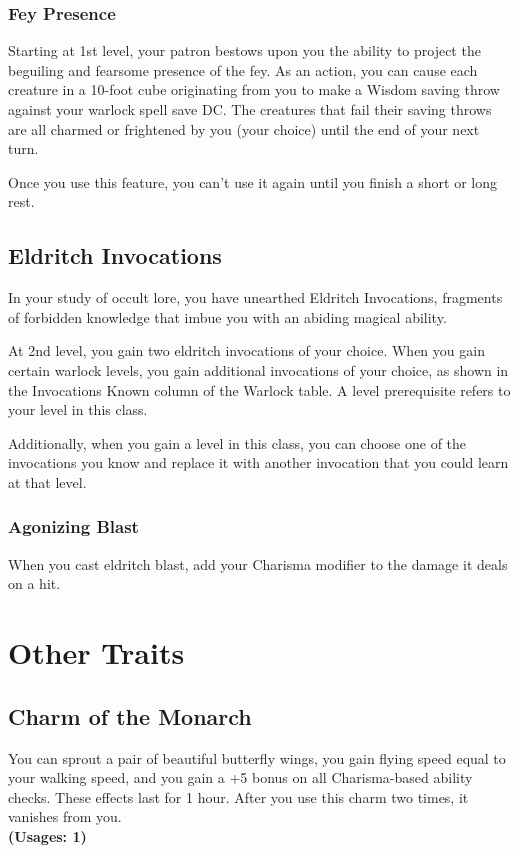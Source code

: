 \documentclass[letterpaper,openany,oneside,twocolumn]{book}
\begin{document}
\subsubsection*{Fey Presence}
Starting at 1st level, your patron bestows upon you the ability to project the beguiling and fearsome presence of the fey. As an action, you can cause each creature in a 10-foot cube originating from you to make a Wisdom saving throw against your warlock spell save DC. The creatures that fail their saving throws are all charmed or frightened by you (your choice) until the end of your next turn.

Once you use this feature, you can't use it again until you finish a short or long rest.

\subsection*{Eldritch Invocations}
In your study of occult lore, you have unearthed Eldritch Invocations, fragments of forbidden knowledge that imbue you with an abiding magical ability.

At 2nd level, you gain two eldritch invocations of your choice. When you gain certain warlock levels, you gain additional invocations of your choice, as shown in the Invocations Known column of the Warlock table. A level prerequisite refers to your level in this class.

Additionally, when you gain a level in this class, you can choose one of the invocations you know and replace it with another invocation that you could learn at that level.
\subsubsection*{Agonizing Blast}
When you cast eldritch blast, add your Charisma modifier to the damage it deals on a hit.

\section*{Other Traits}
\subsection*{Charm of the Monarch}
You can sprout a pair of beautiful butterfly wings, you gain flying speed equal to your walking speed, and you gain a +5 bonus on all Charisma-based ability checks. These effects last for 1 hour. After you use this charm two times, it vanishes from you.\\
\textbf{(Usages: 1)}
\end{document}
